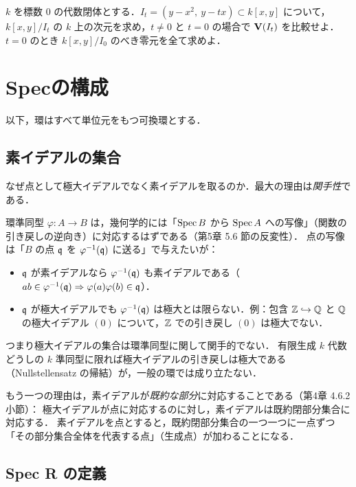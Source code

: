$k$ を標数 $0$ の代数閉体とする．$I_t=(y-x^2,\ y-tx)\subset k[x,y]$ について，$k[x,y]/I_t$ の $k$ 上の次元を求め，$t\ne0$ と $t=0$ の場合で $\mathbf{V}(I_t)$ を比較せよ．$t=0$ のとき $k[x,y]/I_0$ のべき零元を全て求めよ．

\section{Specの構成}

以下，環はすべて単位元をもつ可換環とする．

\subsection{素イデアルの集合}

なぜ点として極大イデアルでなく素イデアルを取るのか．最大の理由は\emph{関手性}である．

環準同型 $\varphi\colon A\to B$ は，幾何学的には「$\operatorname{Spec} B$ から $\operatorname{Spec} A$ への写像」（関数の引き戻しの逆向き）に対応するはずである（第5章 5.6 節の反変性）．
点の写像は「$B$ の点 $\mathfrak{q}$ を $\varphi^{-1}(\mathfrak{q})$ に送る」で与えたいが：
\begin{itemize}
  \item $\mathfrak{q}$ が素イデアルなら $\varphi^{-1}(\mathfrak{q})$ も素イデアルである（$ab\in\varphi^{-1}(\mathfrak{q})\Rightarrow\varphi(a)\varphi(b)\in\mathfrak{q}$）．
  \item $\mathfrak{q}$ が極大イデアルでも $\varphi^{-1}(\mathfrak{q})$ は極大とは限らない．例：包含 $\mathbb{Z}\hookrightarrow\mathbb{Q}$ と $\mathbb{Q}$ の極大イデアル $(0)$ について，$\mathbb{Z}$ での引き戻し $(0)$ は極大でない．
\end{itemize}
つまり極大イデアルの集合は環準同型に関して関手的でない．
有限生成 $k$ 代数どうしの $k$ 準同型に限れば極大イデアルの引き戻しは極大である（Nullstellensatz の帰結）が，一般の環では成り立たない．

もう一つの理由は，素イデアルが\emph{既約な部分}に対応することである（第4章 4.6.2 小節）：
極大イデアルが点に対応するのに対し，素イデアルは既約閉部分集合に対応する．
素イデアルを点とすると，既約閉部分集合の一つ一つに一点ずつ「その部分集合全体を代表する点」（生成点）が加わることになる．

\subsection{Spec R の定義}

